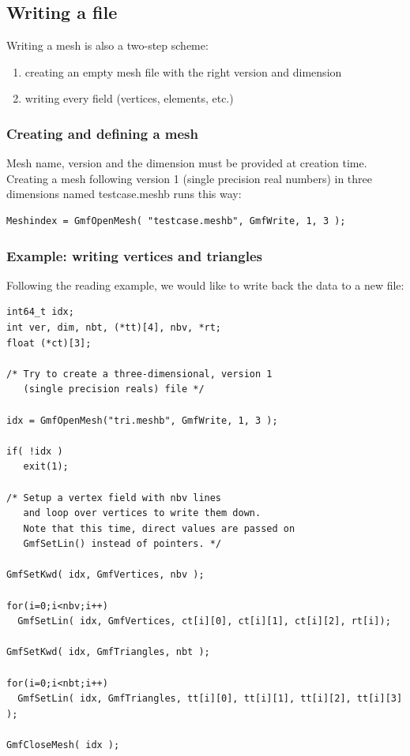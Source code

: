 \documentclass[a4paper,12pt]{article}
\begin{document}
\subsection{Writing a file}

Writing a mesh is also a two-step scheme:

\begin{enumerate}
\item creating an empty mesh file with the right version and dimension
\item writing every field (vertices, elements, etc.)
\end{enumerate}

\subsubsection{Creating and defining a mesh}

Mesh name, version and the dimension must be provided at creation time. Creating a mesh following version 1 (single precision real numbers) in three dimensions named testcase.meshb runs this way:

\begin{tt}
\begin{verbatim}
Meshindex = GmfOpenMesh( "testcase.meshb", GmfWrite, 1, 3 );
\end{verbatim}
\end{tt}
\normalfont

\subsubsection{Example: writing vertices and triangles}

Following the reading example, we would like to write back the data to a new file:

\begin{tt}
\begin{verbatim}
int64_t idx;
int ver, dim, nbt, (*tt)[4], nbv, *rt;
float (*ct)[3];

/* Try to create a three-dimensional, version 1
   (single precision reals) file */

idx = GmfOpenMesh("tri.meshb", GmfWrite, 1, 3 );

if( !idx )
   exit(1);

/* Setup a vertex field with nbv lines
   and loop over vertices to write them down.
   Note that this time, direct values are passed on
   GmfSetLin() instead of pointers. */

GmfSetKwd( idx, GmfVertices, nbv );

for(i=0;i<nbv;i++)
  GmfSetLin( idx, GmfVertices, ct[i][0], ct[i][1], ct[i][2], rt[i]);

GmfSetKwd( idx, GmfTriangles, nbt );

for(i=0;i<nbt;i++)
  GmfSetLin( idx, GmfTriangles, tt[i][0], tt[i][1], tt[i][2], tt[i][3] );

GmfCloseMesh( idx );
\end{verbatim}
\end{tt}
\normalfont
\end{document}
